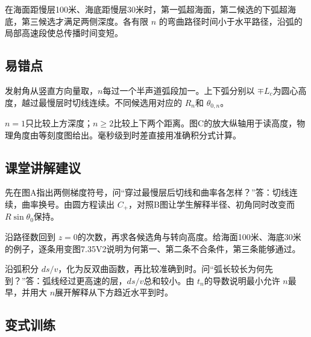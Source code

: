 \documentclass[UTF8,fontset=fandol,a4paper,11pt]{ctexart}
\begin{document}
在海面距慢层100米、海底距慢层30米时，第一弧超海面，第二候选的下弧超海底，第三候选才满足两侧深度。各有限 $n$ 的弯曲路径时间小于水平路径，沿弧的局部高速段使总传播时间变短。




\subsection*{易错点}

发射角从竖直方向量取，$n$每过一个半声道弧段加一。上下弧分别以 $\mp L_c$为圆心高度，越过最慢层时切线连续。不同候选用对应的 $R_n$和 $\theta_{0,n}$。

$n=1$只比较上方深度；$n\ge2$比较上下两个距离。图C的放大纵轴用于读高度，物理角度由等刻度图给出。毫秒级到时差直接用准确积分式计算。




\subsection*{课堂讲解建议}

先在图A指出两侧梯度符号，问“穿过最慢层后切线和曲率各怎样？”答：切线连续，曲率换号。由圆方程读出 $C_+$，对照B图让学生解释半径、初角同时改变而 $R\sin\theta_0$保持。

沿路径数回到 $z=0$的次数，再求各候选角与转向高度。给海面100米、海底30米的例子，逐条用变图7.35V2说明为何第一、第二条不合条件，第三条能够通过。

沿弧积分 $ds/v$，化为反双曲函数，再比较准确到时。问“弧长较长为何先到？”答：弧线经过更高速的层，$ds/v$总和较小。由 $t_n$的导数说明最小允许 $n$最早，并用大 $n$展开解释从下方趋近水平到时。




\subsection*{变式训练}
\end{document}
